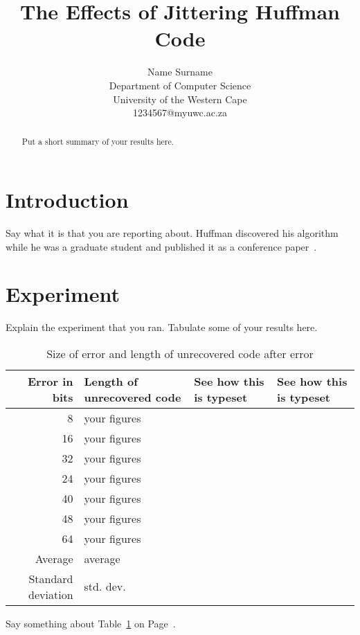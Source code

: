 \documentclass[a4wide,11pt]{article}
\begin{document}
\author{
	Name Surname\\
	Department of Computer Science\\
	University of the Western Cape\\
	\vspace{5pt}
	{\small 1234567@myuwc.ac.za}}
\title{The Effects of Jittering Huffman Code}
\maketitle
\begin{abstract}
Put a short summary of your results here.
\end{abstract}
\section{Introduction}
\label{section:introduction}
Say what it is that you are reporting about.  Huffman discovered his algorithm while he 
was a graduate student and published it as a conference paper~\cite{huffman52}.
\section{Experiment}
\label{section:experiment}
Explain the experiment that you ran. Tabulate some of your results here.
\begin{table}[h]
\caption{Size of error and length of unrecovered code after error}
\label{table:recovery}
\begin{center}
\begin{tabular}{rl|p{36pt}|p{36pt}}
\hline
Error in bits & Length of unrecovered code & See how this is typeset & See how this is typeset \\
\hline
            8 & your figures\\
           16 & your figures\\
           32 & your figures\\
           24 & your figures\\
           40 & your figures\\
           48 & your figures\\
           64 & your figures\\
\hline
      Average & average      \\
Standard deviation & std. dev.\\        
\hline
\end{tabular} 
\end{center}
\end{table}
Say something about Table~\ref{table:recovery} on Page~\pageref{table:recovery}.  %
\end{document}
